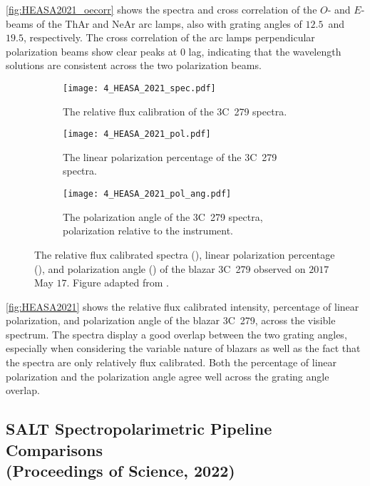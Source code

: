 \autoref{fig:HEASA2021_oecorr} shows the spectra and cross correlation of the $O$- and $E$-beams of the \gls{ThAr} and \gls{NeAr} arc lamps, also with grating angles of $12.5$\degree\ and $19.5$\degree, respectively.
The cross correlation of the arc lamps perpendicular polarization beams show clear peaks at $0$ lag, indicating that the wavelength solutions are consistent across the two polarization beams.

\begin{figure}[t]
    \centering
    \begin{subfigure}[b]{1.0\textwidth}
        \centering
        \texttt{[image: 4\_HEASA\_2021\_spec.pdf]}
        \caption{The relative flux calibration of the 3C~279 spectra.}
        \label{subfig:HEASA2021_spec}
    \end{subfigure}
    \hfill
    \begin{subfigure}[b]{1.0\textwidth}
        \centering
        \texttt{[image: 4\_HEASA\_2021\_pol.pdf]}
        \caption{The linear polarization percentage of the 3C~279 spectra.}
        \label{subfig:HEASA2021_pol}
    \end{subfigure}
    \hfill
    \begin{subfigure}[b]{1.0\textwidth}
        \centering
        \texttt{[image: 4\_HEASA\_2021\_pol\_ang.pdf]}
        \caption{The polarization angle of the 3C~279 spectra, polarization relative to the instrument.}
        \label{subfig:HEASA2021_pol_ang}
    \end{subfigure}
    \caption{The relative flux calibrated spectra (), linear polarization percentage (), and polarization angle () of the blazar 3C~279 observed on $2017$ May $17$. Figure adapted from \cite{Cooper_HEASA2021}.}
    \label{fig:HEASA2021}
\end{figure}

\autoref{fig:HEASA2021} shows the relative flux calibrated intensity, percentage of linear polarization, and polarization angle of the blazar 3C~279, across the visible spectrum.
The spectra display a good overlap between the two grating angles, especially when considering the variable nature of blazars as well as the fact that the spectra are only relatively flux calibrated.
Both the percentage of linear polarization and the polarization angle agree well across the grating angle overlap.

\subsection[Proceeding, HEASA (2022)]{%
    \gls{SALT} Spectropolarimetric Pipeline Comparisons\\
    (Proceedings of Science,  2022)
}

